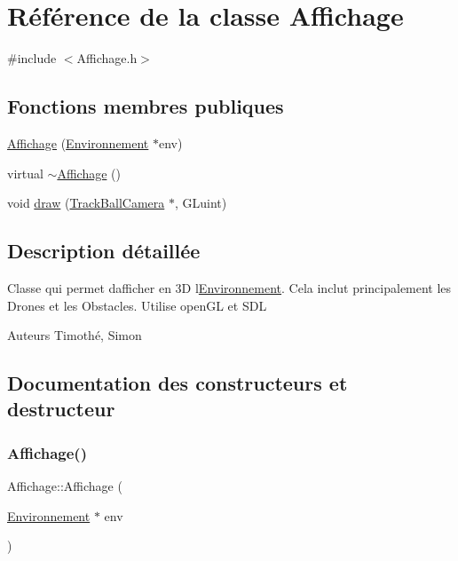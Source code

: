 \hypertarget{class_affichage}{}\section{Référence de la classe Affichage}
\label{class_affichage}


{\ttfamily \#include $<$Affichage.\+h$>$}

\subsection*{Fonctions membres publiques}
\begin{DoxyCompactItemize}
\item 
\mbox{\hyperlink{class_affichage_a1e4cd468a67bff4ddc15d3d245188651}{Affichage}} (\mbox{\hyperlink{class_environnement}{Environnement}} $\ast$env)
\item 
virtual \mbox{\hyperlink{class_affichage_ae6a4f4db7a0d8d2abc8bd44c1be674c0}{$\sim$\+Affichage}} ()
\item 
void \mbox{\hyperlink{class_affichage_af90570851774c1f36d53ed10fb016f47}{draw}} (\mbox{\hyperlink{class_track_ball_camera}{Track\+Ball\+Camera}} $\ast$, G\+Luint)
\end{DoxyCompactItemize}


\subsection{Description détaillée}
Classe qui permet d\textquotesingle{}afficher en 3D l\textquotesingle{}\mbox{\hyperlink{class_environnement}{Environnement}}. Cela inclut principalement les Drones et les Obstacles. Utilise open\+GL et S\+DL \begin{DoxyAuthor}{Auteurs}
Timothé, Simon 
\end{DoxyAuthor}


\subsection{Documentation des constructeurs et destructeur}
\mbox{\label{class_affichage_a1e4cd468a67bff4ddc15d3d245188651}} 
\subsubsection{\texorpdfstring{Affichage()}{Affichage()}}
{\footnotesize\ttfamily Affichage\+::\+Affichage (\begin{DoxyParamCaption}\item[{\mbox{\hyperlink{class_environnement}{Environnement}} $\ast$}]{env }\end{DoxyParamCaption})}

